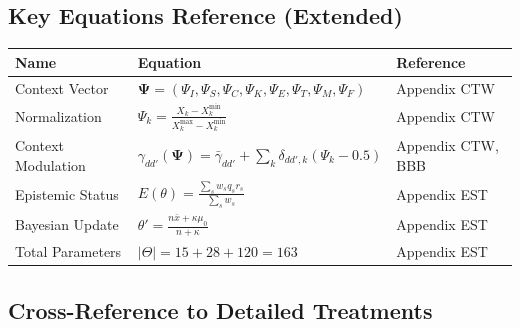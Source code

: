 \subsection{Key Equations Reference (Extended)}
\label{sec:glossary-equations-ext}

\begin{center}
\renewcommand{\arraystretch}{1.5}
\begin{tabular}{@{}lp{6cm}l@{}}
\toprule
\textbf{Name} & \textbf{Equation} & \textbf{Reference} \\
\midrule
Context Vector & $\boldsymbol{\Psi} = (\Psi_I, \Psi_S, \Psi_C, \Psi_K, \Psi_E, \Psi_T, \Psi_M, \Psi_F)$ & Appendix CTW \\
Normalization & $\Psi_k = \frac{X_k - X_k^{\min}}{X_k^{\max} - X_k^{\min}}$ & Appendix CTW \\
Context Modulation & $\gamma_{dd'}(\boldsymbol{\Psi}) = \bar{\gamma}_{dd'} + \sum_k \delta_{dd',k}(\Psi_k - 0.5)$ & Appendix CTW, BBB \\
Epistemic Status & $E(\theta) = \frac{\sum_s w_s q_s r_s}{\sum_s w_s}$ & Appendix EST \\
Bayesian Update & $\theta' = \frac{n\bar{x} + \kappa\mu_0}{n + \kappa}$ & Appendix EST \\
Total Parameters & $|\Theta| = 15 + 28 + 120 = 163$ & Appendix EST \\
\bottomrule
\end{tabular}
\end{center}



\subsection{Cross-Reference to Detailed Treatments}

